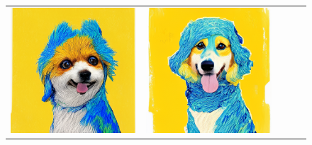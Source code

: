 \begin{figure}[!ht]
\begin{tabular}[t]{c c c c c}
    \includegraphics[width=\xwidth]{cp2/figures/dreambooth/dog/c160_checkpoint_99.png} &
    \includegraphics[width=\xwidth]{cp2/figures/dreambooth/dog/c192_checkpoint_99.png} \\

\end{tabular}
\end{figure}
